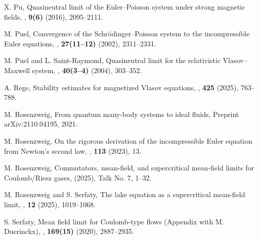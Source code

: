 \documentclass[11pt,reqno]{amsart}
\numberwithin{equation}{section}
\begin{document}
\begin{thebibliography}{}
X. Pu,
\newblock Quasineutral limit of the Euler--Poisson system
under strong magnetic fields,
,
{\bf 9(6)} (2016), 2095--2111.

M. Puel,
\newblock Convergence of the Schr{\"o}dinger--Poisson system to the incompressible Euler equations,
, {\bf 27(11--12)} (2002), 2311--2331.

M. Puel and L. Saint-Raymond,
\newblock Quasineutral limit for the relativistic Vlasov--Maxwell system,
, {\bf 40(3--4)} (2004), 303--352.

A. Rege,
\newblock Stability estimates for magnetized Vlasov equations,
, {\bf 425} (2025), 763--788.

M. Rosenzweig,
\newblock From quantum many-body systems to ideal fluids,
\newblock Preprint arXiv:2110.04195, 2021.

M. Rosenzweig,
\newblock On the rigorous derivation of the incompressible Euler equation from Newton's second law,
, {\bf 113} (2023), 13.

M. Rosenzweig,
\newblock Commutators, mean-field, and supercritical mean-field limits for Coulomb/Riesz gases,
 (2025), Talk No. 7, 1--32.

M. Rosenzweig and S. Serfaty,
\newblock The lake equation as a supercritical mean-field limit,
, {\bf 12} (2025), 1019--1068.

S. Serfaty,
\newblock Mean field limit for Coulomb-type flows (Appendix with M. Duerinckx),
, {\bf 169(15)} (2020), 2887--2935.

\end{thebibliography}
\end{document}
